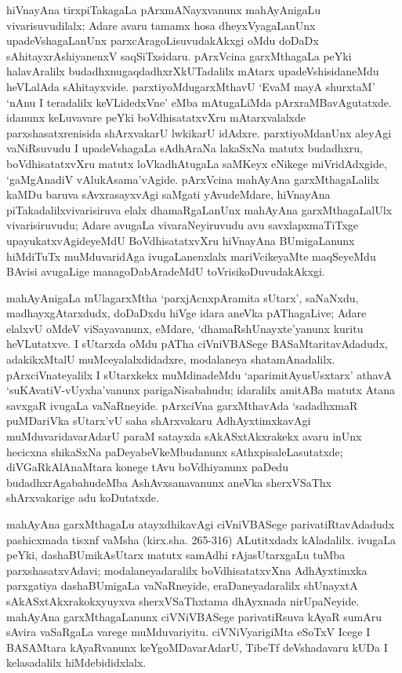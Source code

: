 hiVnayAna tirxpiTakagaLa pArxmANayxvanunx mahAyAnigaLu vivarisuvudilalx; Adare avaru tamamx hosa dheyxVyagaLanUnx upadeVshagaLanUnx parxcAragoLisuvudakAkxgi oMdu doDaDx sAhitayxrAshiyanenxV saqSiTxsidaru. pArxVcina garxMthagaLa peYki halavAralilx  \hbox{budadhxnu}\break gaqdadhxrX\-kUTadalilx mAtarx upadeVshisidaneMdu heVLalAda sAhitayxvide. parxtiyoMdu\break garxMthavU `EvaM mayA shurxtaM' `nAnu I teradalilx keVLidedxVne' eMba mAtugaLiMda pArxraMBavAgutatxde. idanunx keLuvavare peYki boVdhisatatxvXru mAtarxvalalxde parxshasatxrenisida shArxvakarU lwkikarU idAdxre. parxtiyoMdanUnx aleyAgi vaNiRsuvudu I upa\-deVshagaLa sAdhAraNa lakaSxNa matutx budadhxru, boVdhisatatxvXru matutx loVkadhAtugaLa saMKeyx eNikege miVridAdxgide, `gaMgAnadiV vAlukAsama'vAgide. pArxVcina mahAyAna garxMtha\break\-gaLalilx kaMDu baruva  sAvxrasayxvAgi saMgati yAvudeMdare, hiVnayAna piTakadalilx\break vivarisiruva elalx dhamaRgaLanUnx mahAyAna garxMthagaLalUlx vivarisiruvudu; Adare avugaLa vivaraNeyiruvudu avu savxlapxmaTiTxge upayukatxvAgideyeMdU BoVdhi\-satatxvXru hiVnayAna BUmigaLanunx hiMdiTuTx muMduvaridAga ivugaLanenxlalx mariVcikeyaMte maqSeyeMdu BAvisi avugaLige managoDabAradeMdU toVrisikoDuvudakAkxgi.

mahAyAnigaLa mUlagarxMtha `parxjAcnxpAramita sUtarx', saNaNxdu, madhayxgAtarxdudx, doDaDxdu hiVge idara aneVka pAThagaLive; Adare elalxvU oMdeV viSayavanunx, eMdare, `dhamaRshUnayxte'yanunx kuritu heVLutatxve. I sUtarxda oMdu pATha ciVniVBASege BASaMtaritavAdadudx, adakikxMtalU muMceyalalxdidadxre, modalaneya shatamAnadalilx. pArxciVnateyalilx I sUtarxkekx muMdinadeMdu `aparimitAyusUsxtarx' athavA `suKAvatiV-vUyxha'vanunx parigaNisabahudu; idaralilx amitABa matutx Atana savxgaR ivugaLa vaNaRneyide. pArxciVna garxMthavAda `sadadhxmaR puMDariVka sUtarx'vU saha shArxvakaru AdhAyxtimxkavAgi muMduvaridavarAdarU paraM satayxda sAkASxtAkxrakekx avaru inUnx hecicxna shikaSxNa paDeyabeVkeMbudanunx sAthxpisaleLasutatxde; diVGaRkAlAnaMtara konege tAvu boVdhiyanunx paDedu budadhxrAgabahudeMba AshAvxsanavanunx aneVka sherxVSaThx shArxvakarige adu koDutatxde.

mahAyAna garxMthagaLu atayxdhikavAgi ciVniVBASege parivatiRtavAdadudx pashicxmada tisxnf vaMsha (kirx.sha. 265-316) ALutitxdadx kAladalilx. ivugaLa peYki, dashaBUmikA\-sUtarx matutx samAdhi rAjasUtarxgaLu tuMba parxshasatxvAdavi; modalaneyadaralilx boVdhisatatxvXna AdhAyxtimxka parxgatiya dashaBUmigaLa vaNaRneyide, eraDaneyadaralilx shUnayxtA sAkASxtAkxrakokxyuyxva sherxVSaThxtama dhAyxnada nirUpaNeyide. mahAyAna garxMthagaLanunx ciVNiVBASege parivatiRsuva kAyaR sumAru sAvira vaSaRgaLa varege muMduvariyitu. ciVNiVyarigiMta eSoTxV Icege I BASAMtara kAyaRvanunx keYgoMDavarAdarU, TibeTf deVshadavaru kUDa I kelasadalilx hiMdebididxlalx.

